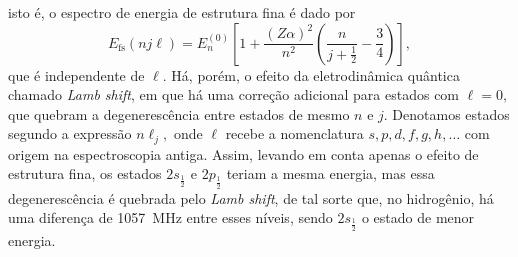 isto é, o espectro de energia de estrutura fina é dado por
\begin{equation*}
   E_\mathrm{fs}(nj\ell) = E_n^{(0)}\left[1 + \frac{(Z\alpha)^2}{n^2}\left(\frac{n}{j + \frac12} - \frac34\right)\right],
\end{equation*}
que é independente de \(\ell.\) Há, porém, o efeito da eletrodinâmica quântica chamado \emph{Lamb shift}, em que há uma correção adicional para estados com \(\ell = 0,\) que quebram a degenerescência entre estados de mesmo \(n\) e \(j\). Denotamos estados segundo a expressão \(n \ell_j,\) onde \(\ell\) recebe a nomenclatura \(s, p, d, f,g,h, \dots\) com origem na espectroscopia antiga. Assim, levando em conta apenas o efeito de estrutura fina, os estados \(2s_{\frac12}\) e \(2p_{\frac12}\) teriam a mesma energia, mas essa degenerescência é quebrada pelo \emph{Lamb shift}, de tal sorte que, no hidrogênio, há uma diferença de \SI{1057}{MHz} entre esses níveis, sendo \(2s_{\frac12}\) o estado de menor energia.
